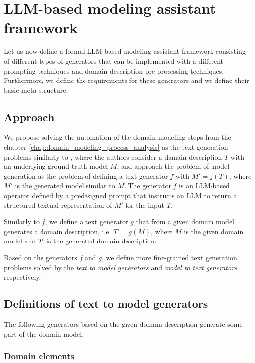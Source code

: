 \chapter{LLM-based modeling assistant framework}
\label{chap:framework}

Let us now define a formal LLM-based modeling assistant framework consisting of different types of generators that can be implemented with a different prompting techniques and domain description pre-processing techniques. Furthermore, we define the requirements for these generators and we define their basic meta-structure.


\section{Approach}

We propose solving the automation of the domain modeling steps from the chapter \ref{chap:domain_modeling_process_analysis} as the text generation problems similarly to \citet{Chen2023}, where the authors consider a domain description $T$ with an underlying ground truth model $M$, and approach the problem of model generation as the problem of defining a text generator $f$ with $M' = f(T)$, where $M'$ is the generated model similar to $M$. The generator $f$ is an LLM-based operator defined by a predesigned prompt that instructs an LLM to return a structured textual representation of $M'$ for the input $T$.

Similarly to $f$, we define a text generator $g$ that from a given domain model generates a domain description, i.e. $T' = g(M)$, where $M$ is the given domain model and $T'$ is the generated domain description.

Based on the generators $f$ and $g$, we define more fine-grained text generation problems solved by the \emph{text to model generators} and \emph{model to text generators} respectively.


\section{Definitions of text to model generators}

The following generators based on the given domain description generate some part of the domain model.


\subsection{Domain elements}

